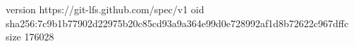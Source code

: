 version https://git-lfs.github.com/spec/v1
oid sha256:7c9b1b77902d22975b20c85cd93a9a364e99d0e728992af1d8b72622c967dffc
size 176028
